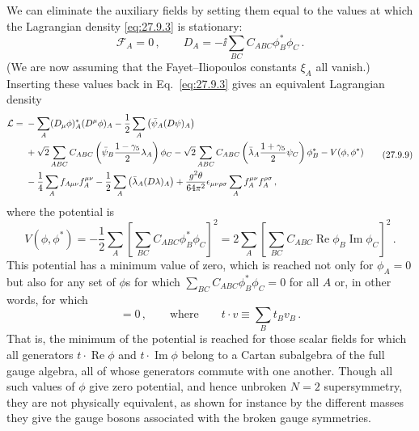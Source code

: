 We can eliminate the auxiliary fields by setting them equal to the values at
which the Lagrangian density \eqref{eq:27.9.3} is stationary:
\begin{equation}
  \mathcal{F}_A=0\,,
  \qquad
  D_A=-\ii\sum_{BC}C_{ABC}\phi_B^*\phi_C\,.
  \tag{27.9.8}\label{eq:27.9.8}
\end{equation}
(We are now assuming that the Fayet--Iliopoulos constants \(\xi_A\) all
vanish.) Inserting these values back in Eq.~\eqref{eq:27.9.3} gives an
equivalent Lagrangian density
\begin{equation}
  \begin{aligned}
  \mathcal{L}={}&
  -\sum_A(D_\mu\phi)_A^*(D^\mu\phi)_A
  -\frac12\sum_A\left(\bar\psi_A(\sl{D}\psi)_A\right)
  \\
  &+\sqrt{2}\sum_{ABC}C_{ABC}
    \left(\bar\psi_B\frac{1-\gamma_5}{2}\lambda_A\right)\phi_C
  -\sqrt{2}\sum_{ABC}C_{ABC}
    \left(\bar\lambda_A\frac{1+\gamma_5}{2}\psi_C\right)\phi_B^*
  -V(\phi,\phi^*)
  \\
  &-\frac14\sum_Af_{A\mu\nu}f_A^{\mu\nu}
  -\frac12\sum_A\left(\bar\lambda_A(\sl{D}\lambda)_A\right)
  +\frac{g^2\theta}{64\pi^2}\epsilon_{\mu\nu\rho\sigma}
    \sum_Af_A^{\mu\nu}f_A^{\rho\sigma}\,,
  \end{aligned}
  \tag{27.9.9}\label{eq:27.9.9}
\end{equation}
where the potential is
\begin{equation}
  V(\phi,\phi^*)
  =-\frac12\sum_A\left[\sum_{BC}C_{ABC}\phi_B^*\phi_C\right]^2
  =2\sum_A\left[\sum_{BC}C_{ABC}\operatorname{Re}\phi_B
    \operatorname{Im}\phi_C\right]^2\,.
  \tag{27.9.10}\label{eq:27.9.10}
\end{equation}
This potential has a minimum value of zero, which is reached not only for
\(\phi_A=0\) but also for any set of \(\phi\)s for which
\(\sum_{BC}C_{ABC}\phi_B^*\phi_C=0\) for all \(A\) or, in other words, for
which
\begin{equation}
  [t\mathbin{\cdot}\operatorname{Re}\phi,
   t\mathbin{\cdot}\operatorname{Im}\phi]=0\,,
  \qquad
  \text{where}\qquad
  t\mathbin{\cdot}v\equiv\sum_Bt_Bv_B\,.
  \tag{27.9.11}\label{eq:27.9.11}
\end{equation}
That is, the minimum of the potential is reached for those scalar fields for
which all generators \(t\mathbin{\cdot}\operatorname{Re}\phi\) and
\(t\mathbin{\cdot}\operatorname{Im}\phi\) belong to a Cartan subalgebra of
the full gauge algebra, all of whose generators commute with one another.
Though all such values of \(\phi\) give zero potential, and hence unbroken
\(N=2\) supersymmetry, they are not physically equivalent, as shown for
instance by the different masses they give the gauge bosons associated with
the broken gauge symmetries.


